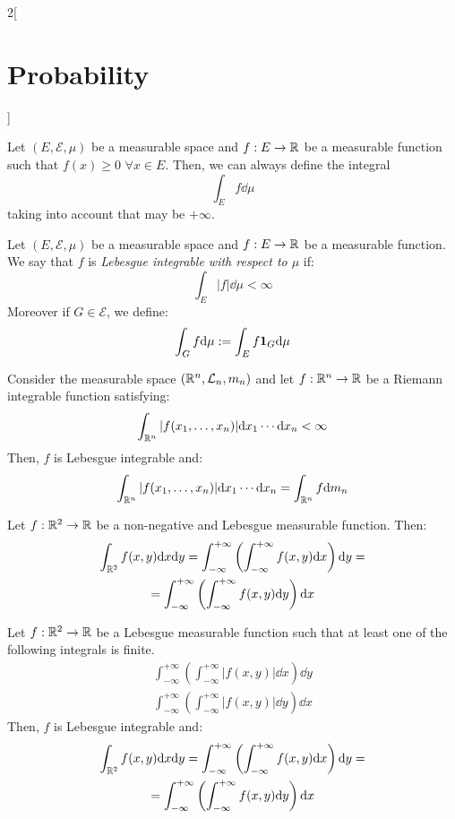 \documentclass[../../../main.tex]{subfiles}
\begin{document}
\begin{multicols}{2}[\section{Probability}]
\begin{definition}
  \end{definition}
  \begin{prop}
    Let $(E,\mathcal{E},\mu)$ be a measurable space and $f:E\rightarrow\mathbb{R}$ be a measurable function such that $f(x)\geq 0$ $\forall x\in E$. Then, we can always define the integral $$\int_Ef\dd\mu$$ taking into account that may be $+\infty$.
  \end{prop}
  \begin{definition}
    Let $(E,\mathcal{E},\mu)$ be a measurable space and $f:E\rightarrow\mathbb{R}$ be a measurable function. We say that $f$ is \textit{Lebesgue integrable with respect to $\mu$} if: $$\int_E|f|\dd\mu<\infty$$
    Moreover if $G\in\mathcal{E}$, we define: $$\int_Gf\dd\mu:=\int_Ef\boldsymbol{\mathrm{1}}_G\dd\mu$$
  \end{definition}
  \begin{prop}
    Consider the measurable space $(\mathbb{R}^n,\mathcal{L}_n,m_n)$ and let $f:\mathbb{R}^n\rightarrow\mathbb{R}$ be a Riemann integrable function satisfying: $$\int_{\mathbb{R}^n}|f(x_1,\ldots,x_n)|\dd x_1\cdots\dd x_n<\infty$$
    Then, $f$ is Lebesgue integrable and: $$\int_{\mathbb{R}^n}|f(x_1,\ldots,x_n)|\dd x_1\cdots\dd x_n=\int_{\mathbb{R}^n}f\dd m_n$$
  \end{prop}
  \begin{theorem}
    Let $f:\mathbb{R}^2\rightarrow\mathbb{R}$ be a non-negative and Lebesgue measurable function. Then:
    \begin{multline*}
      \int_{\mathbb{R}^2}f(x,y)\dd x\dd y=\int_{-\infty}^{+\infty}\left(\int_{-\infty}^{+\infty}f(x,y)\dd x\right)\dd y=\\=\int_{-\infty}^{+\infty}\left(\int_{-\infty}^{+\infty}f(x,y)\dd y\right)\dd x
    \end{multline*}
  \end{theorem}
  \begin{theorem}
    Let $f:\mathbb{R}^2\rightarrow\mathbb{R}$ be a Lebesgue measurable function such that at least one of the following integrals is finite.
    \begin{gather*}
      \int_{-\infty}^{+\infty}\left(\int_{-\infty}^{+\infty}|f(x,y)|\dd x\right)\dd y\\
      \int_{-\infty}^{+\infty}\left(\int_{-\infty}^{+\infty}|f(x,y)|\dd y\right)\dd x
    \end{gather*}
    Then, $f$ is Lebesgue integrable and:
    \begin{multline*}
      \int_{\mathbb{R}^2}f(x,y)\dd x\dd y=\int_{-\infty}^{+\infty}\left(\int_{-\infty}^{+\infty}f(x,y)\dd x\right)\dd y=\\=\int_{-\infty}^{+\infty}\left(\int_{-\infty}^{+\infty}f(x,y)\dd y\right)\dd x
    \end{multline*}
  \end{theorem}

\end{multicols}
\end{document}
